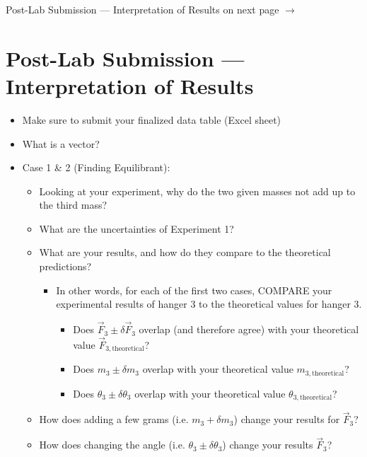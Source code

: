 Post-Lab Submission --- Interpretation of Results on next page $\xrightarrow{}$




\pagebreak

\section{Post-Lab Submission --- Interpretation of Results}
\label{M1:Interpretation}
\begin{itemize}

\item Make sure to submit your finalized data table (Excel sheet)
\item What is a vector?
\item Case 1 \& 2 (Finding Equilibrant):
\begin{itemize}
    \item Looking at your experiment, why do the two given masses not add up to the third mass?
    \item What are the uncertainties of Experiment 1?
    \item What are your results, and how do they compare to the theoretical predictions?
        \begin{itemize}
        \item In other words, for each of the first two cases, COMPARE your experimental results of hanger 3 to the theoretical values for hanger 3.
            \begin{itemize}
            \item Does $\vec{F}_3 \pm \delta \vec{F}_3$ overlap (and therefore agree) with your theoretical value $\vec{F}_{3,\text{theoretical}}$? 
            \item Does $m_3 \pm \delta m_3$ overlap with your theoretical value $m_{3,\text{theoretical}}$?
            \item Does $\theta_3 \pm \delta \theta_3$ overlap with your theoretical value $\theta_{3,\text{theoretical}}$?
            \end{itemize}
        \end{itemize}
    \item How does adding a few grams (i.e. $m_3 + \delta m_3$) change your results for $\vec{F}_3$?
    \item How does changing the angle (i.e. $\theta_3 \pm \delta \theta_3$) change your results $\vec{F}_3$?
\end{itemize}


\end{itemize}

